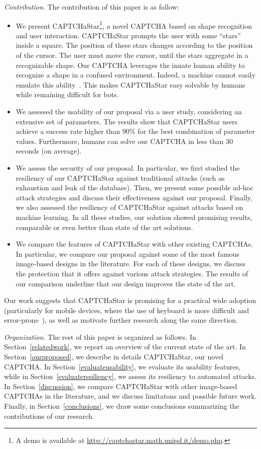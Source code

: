 \documentclass[conference]{IEEEtran}
\begin{document}
\noindent
\textit{Contribution}. The contribution of this paper is as follow:
\begin{itemize}
\item We present CAPTCHaStar\footnote{A demo is available at \url{http://captchastar.math.unipd.it/demo.php}.}, a novel CAPTCHA based on shape recognition and user interaction. 
CAPTCHaStar prompts the user with some ``stars'' inside a square. 
  The position of these stars changes according to the position of the cursor. The user must move the cursor, until the stars aggregate in a recognizable shape. Our CAPTCHA leverages the innate human ability to recognize a shape in a confused environment. Indeed, a machine cannot easily emulate this ability~\cite{hinton2007recognize}.
  This makes CAPTCHaStar easy solvable by humans while remaining difficult for bots. \item We assessed the usability of our proposal via a user study, considering an extensive set of parameters.
The results show that CAPTCHaStar users achieve a success rate higher than $90\%$ for the best combination of parameter values. Furthermore, humans can solve our CAPTCHA in less than $30$ seconds (on average).
\item
  We assess the security of our proposal.
  In particular, we first studied the resiliency of our CAPTCHaStar against traditional attacks (such as exhaustion and leak of the database). 
Then, we present some possible ad-hoc attack strategies and discuss their effectiveness against our proposal.
  Finally, we also assessed the resiliency of CAPTCHaStar against attacks based on machine learning.
  In all these studies, our solution showed promising results, comparable or even better than state of the art solutions.
\item We compare the features of CAPTCHaStar with other existing CAPTCHAs.
  In particular, we compare our proposal against some
of the most famous image-based designs in the literature.
  For each of these designs, we discuss the protection that it offers against various attack strategies. The results of our comparison underline that our design improves the state of the art.
\end{itemize}
Our work suggests that CAPTCHaStar is promising for a practical wide adoption (particularly for mobile devices, where the use of keyboard is more difficult and error-prone~\cite{reynaga2013usability}), as well as motivate further research along the same direction.

\noindent
\textit{Organization}. The rest of this paper is organized as follows.
In Section~\ref{relatedwork}, we report an overview of the current state of the art.
In Section~\ref{ourproposed}, we describe in details CAPTCHaStar, our novel CAPTCHA.
In Section~\ref{evaluateusability}, we evaluate its usability features, while in Section~\ref{evaluateresiliency}, we assess its resiliency to automated attacks.
In Section~\ref{discussion}, we compare CAPTCHaStar with other image-based CAPTCHAs in the literature, and we discuss limitatons and possible future work.
Finally, in Section~\ref{conclusions}, we draw some conclusions summarizing the contributions of our research.
\end{document}
